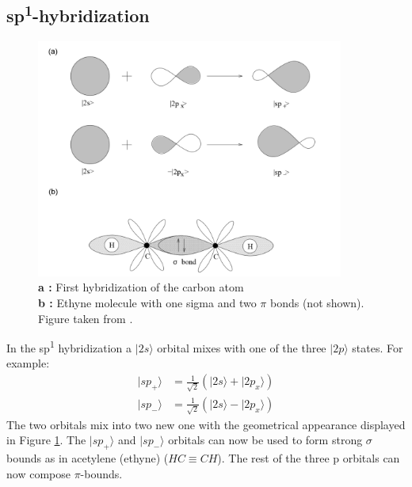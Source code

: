 		\subsection{sp\textsuperscript{1}-hybridization}
			\begin{figure}[h]
				\centering
				\includegraphics[width=0.9\textwidth]{figures/Carbon/carbonHybridization.png}
				\caption{\textbf{a :} First hybridization of the carbon atom \\
				\textbf{b :} Ethyne molecule with one sigma and two $\pi$ bonds (not shown).\\
				Figure taken from \cite{grapheneIntroduction}.}
				\label{fig:carbonHybridization}
			\end{figure}	
			In the sp\textsuperscript{1} hybridization a $|2s \rangle$ orbital mixes with one of the three $|2p \rangle$ states. For example:
			\begin{align}
				| sp_+ \rangle &= \tfrac{1}{\sqrt{2}} (|2s \rangle + |2p_x \rangle) \\
				| sp_- \rangle &= \tfrac{1}{\sqrt{2}} (|2s \rangle - | 2p_x \rangle)
			\end{align}
			The two orbitals mix into two new one with the geometrical appearance displayed in Figure \ref{fig:carbonHybridization}. The $|sp_+ \rangle$ and $|sp_- \rangle$ orbitals can now be used to form strong $\sigma$ bounds as in acetylene (ethyne) ($HC \equiv CH$). The rest of the three p orbitals can now compose $\pi$-bounds.
			
			
					
